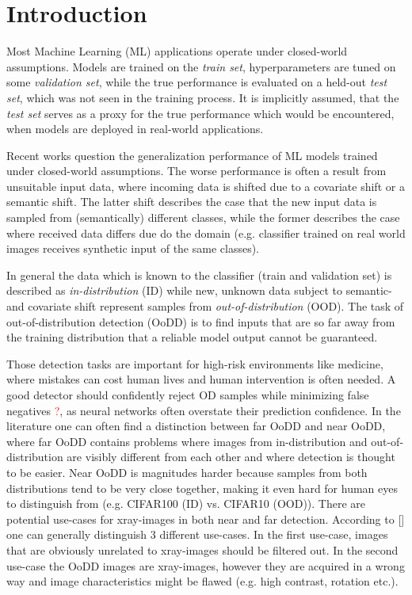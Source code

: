 \section{Introduction}
\raggedbottom
Most Machine Learning (ML) applications operate under closed-world assumptions.
Models are trained on the \textit{train set}, hyperparameters are tuned on some \textit{validation set}, while the true performance is evaluated on a held-out \textit{test set}, which was not seen in the training process.
It is implicitly assumed, that the \textit{test set} serves as a proxy for the true performance which would be encountered, when models are deployed in real-world applications.
\par
Recent works question the generalization performance of ML models trained under closed-world assumptions.
The worse performance is often a result from unsuitable input data, where incoming data is shifted due to a covariate shift or a semantic shift.
The latter shift describes the case that the new input data is sampled from (semantically) different classes, while the former describes the case where received data differs due do the domain (e.g. classifier trained on real world images receives synthetic input of the same classes).
\par
In general the data which is known to the classifier (train and validation set) is described as \textit{in-distribution} (ID) while new, unknown data subject to semantic- and covariate shift represent samples from \textit{out-of-distribution} (OOD).
The task of out-of-distribution detection (OoDD) is to find inputs that are so far away from the training distribution that a reliable model output cannot be guaranteed.
\par
Those detection tasks are important for high-risk environments like medicine, where mistakes can cost human lives and human intervention is often needed.
A good detector should confidently reject OD samples while minimizing false negatives \textcolor{red}{?}, as neural networks often overstate their prediction confidence.
In the literature one can often find a distinction between far OoDD and near OoDD, where far OoDD contains problems where images from in-distribution and out-of-distribution are visibly different from each other and where detection is thought to be easier.
Near OoDD is magnitudes harder because samples from both distributions tend to be very close together, making it even hard for human eyes to distinguish from (e.g. CIFAR100 (ID) vs. CIFAR10 (OOD)).
There are potential use-cases for xray-images in both near and far detection.
According to [] one can generally distinguish 3 different use-cases.
In the first use-case, images that are obviously unrelated to xray-images should be filtered out.
In the second use-case the OoDD images are xray-images, however they are acquired in a wrong way and image characteristics might be flawed (e.g. high contrast, rotation etc.).

